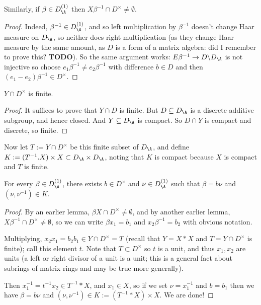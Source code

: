 \begin{lemma}
  \label{X_meets_kernel'}
  Similarly, if $\beta\in D_{\A}^{(1)}$ then
  $X\beta^{-1}\cap D^\times\not=\emptyset$.
\end{lemma}
\begin{proof}
  Indeed, $\beta^{-1}\in D_{\A}^{(1)}$, and so left multiplication by $\beta^{-1}$
  doesn't change Haar measure on $D_{\A}$, so neither does right multiplication
  (as they change Haar measure by the same amount, as $D$ is a form of a matrix
  algebra: did I remember to prove this? {\bf TODO}).
  So the same argument works: $E\beta^{-1}\to D\backslash D_{\A}$ is not
  injective so choose $e_1\beta^{-1}\not=e_2\beta^{-1}$ with difference $b\in D$
  and then $(e_1-e_2)\beta^{-1}\in D^\times$.
\end{proof}

\begin{lemma}
  \label{Y_meet_units_D}
  $Y\cap D^\times$ is finite.
\end{lemma}
\begin{proof} It suffices to prove that $Y\cap D$ is finite.
    But $D\subseteq D_{\A}$ is a discrete additive subgroup, and hence closed.
    And $Y\subseteq D_{\A}$ is compact.
    So $D\cap Y$ is compact and discrete, so finite.
\end{proof}

Now let $T:=Y\cap D^\times$ be this finite subset
of $D_{\A}$, and define $K:= (T^{-1}.X) \times X\subset D_{\A}\times D_{\A}$,
noting that $K$ is compact because $X$ is compact and $T$ is finite.

\begin{lemma} For every $\beta\in D_{\A}^{(1)}$, there exists $b\in D^\times$
  and $\nu\in D_{\A}^{(1)}$ such that $\beta=b\nu$ and $(\nu,\nu^{-1})\in K.$
\end{lemma}
\begin{proof}

  By an earlier lemma, $\beta X\cap D^\times\not=\emptyset$, and by another earlier lemma,
  $X\beta^{-1}\cap D^\times\not=\emptyset$, so we can write $\beta x_1=b_1$
  and $x_2\beta^{-1}=b_2$ with obvious notation.

  Multiplying, $x_2x_1=b_2b_1\in Y\cap D^\times=T$ (recall that $Y=X*X$ and $T=Y\cap D^\times$
  is finite); call this element $t$.
  Note that $T\subset D^\times$ so $t$ is a unit, and thus $x_1,x_2$ are units
  (a left or right divisor of a unit is a unit; this is a general fact about subrings of matrix
  rings and may be true more generally).

  Then $x_1^{-1}=t^{-1}x_2\in T^{-1}*X$, and $x_1\in X$, so if we set $\nu=x_1^{-1}$
  and $b=b_1$ then we have $\beta=b\nu$ and $(\nu,\nu^{-1})\in K := (T^{-1}*X)\times X$.
  We are done!
\end{proof}

